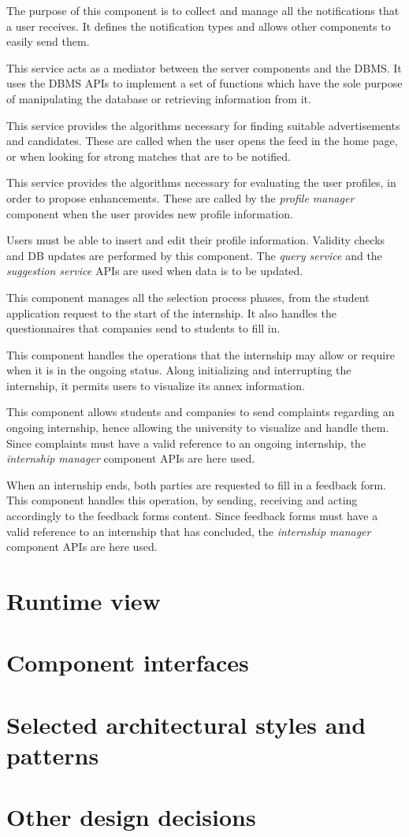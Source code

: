 The purpose of this component is to collect and manage all the notifications that a user receives.
It defines the notification types and allows other components to easily send them.

This service acts as a mediator between the server components and the DBMS.
It uses the DBMS APIs to implement a set of functions which have the sole purpose of manipulating the database or retrieving information from it.

This service provides the algorithms necessary for finding suitable advertisements and candidates.
These are called when the user opens the feed in the home page, or when looking for strong matches that are to be notified. 

This service provides the algorithms necessary for evaluating the user profiles, in order to propose enhancements.
These are called by the \textit{profile manager} component when the user provides new profile information. 

Users must be able to insert and edit their profile information.
Validity checks and DB updates are performed by this component.
The \textit{query service} and the \textit{suggestion service} APIs are used when data is to be updated.

This component manages all the selection process phases, from the student application request to the start of the internship.
It also handles the questionnaires that companies send to students to fill in.

This component handles the operations that the internship may allow or require when it is in the ongoing status.
Along initializing and interrupting the internship, it permits users to visualize its annex information.

This component allows students and companies to send complaints regarding an ongoing internship, hence allowing the university to visualize and handle them.
Since complaints must have a valid reference to an ongoing internship, the \textit{internship manager} component APIs are here used.

When an internship ends, both parties are requested to fill in a feedback form.
This component handles this operation, by sending, receiving and acting accordingly to the feedback forms content. 
Since feedback forms must have a valid reference to an internship that has concluded, the \textit{internship manager} component APIs are here used.

\section{Runtime view}
\section{Component interfaces}
\section{Selected architectural styles and patterns}
\section{Other design decisions}
